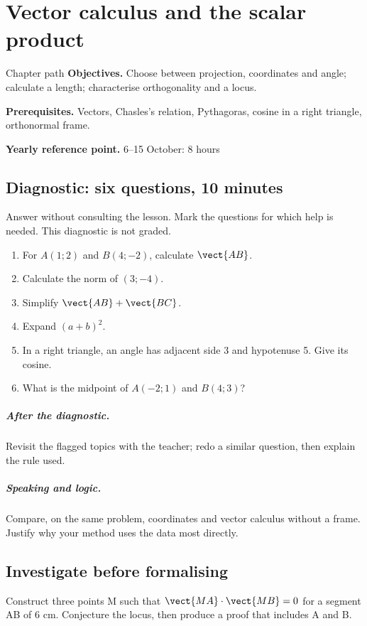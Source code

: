 \chapter{Vector calculus and the scalar product}\label{C03}
\begin{repere}{Chapter path}
\textbf{Objectives.} Choose between projection, coordinates and angle; calculate a length; characterise orthogonality and a locus.

\textbf{Prerequisites.} Vectors, Chasles's relation, Pythagoras, cosine in a right triangle, orthonormal frame.

\textbf{Yearly reference point.} 6--15 October: 8 hours\end{repere}
\section*{Diagnostic: six questions, 10 minutes}\label{C03-D}
Answer without consulting the lesson. Mark the questions for which help is needed. This diagnostic is not graded.
\begin{enumerate}
\item For $A(1;2)$ and $B(4;-2)$, calculate $\vect{AB}$.
\item Calculate the norm of $(3;-4)$.
\item Simplify $\vect{AB}+\vect{BC}$.
\item Expand $(a+b)^2$.
\item In a right triangle, an angle has adjacent side 3 and hypotenuse 5. Give its cosine.
\item What is the midpoint of $A(-2;1)$ and $B(4;3)$?
\end{enumerate}
\paragraph{After the diagnostic.} Revisit the flagged topics with the teacher; redo a similar question, then explain the rule used.
\paragraph{Speaking and logic.} Compare, on the same problem, coordinates and vector calculus without a frame. Justify why your method uses the data most directly.
\clearpage
\section*{Investigate before formalising}\label{C03-RECH}
Construct three points M such that $\vect{MA}\cdot\vect{MB}=0$ for a segment AB of 6 cm. Conjecture the locus, then produce a proof that includes A and B.
